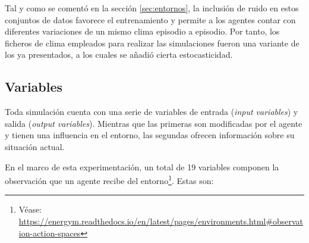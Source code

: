 Tal y como se comentó en la sección \ref{sec:entornos}, la inclusión de ruido en estos conjuntos de datos favorece el entrenamiento y permite a los agentes contar con diferentes variaciones de un mismo clima episodio a episodio. Por tanto, los ficheros de clima empleados para realizar las simulaciones fueron una variante de los ya presentados, a los cuales se añadió cierta estocasticidad.

\subsection{Variables}
\label{sec:variables}

Toda simulación cuenta con una serie de variables de entrada (\textit{input variables}) y salida (\textit{output variables}). Mientras que las primeras son modificadas por el agente y tienen una influencia en el entorno, las segundas ofrecen información sobre su situación actual.

En el marco de esta experimentación, un total de 19 variables componen la observación que un agente recibe del entorno\footnote{Véase: \url{https://energym.readthedocs.io/en/latest/pages/environments.html\#observation-action-spaces}}. Estas son:


